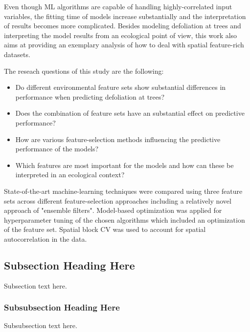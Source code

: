\documentclass[letterpaper, journal]{IEEEtran}
\begin{document}
Even though \ac{ML} algorithms are capable of handling highly-correlated input variables, the fitting time of models increase substantially and the interpretation of results becomes more complicated.
Besides modeling defoliation at trees and interpreting the model results from an ecological point of view, this work also aims at providing an exemplary analysis of how to deal with spatial feature-rich datasets.

The reseach questions of this study are the following:

\begin{itemize}

	\item Do different environmental feature sets show substantial differences in performance when predicting defoliation at trees?

    \item Does the combination of feature sets have an substantial effect on predictive performance?

    \item How are various feature-selection methods influencing the predictive performance of the models?

	\item Which features are most important for the models and how can these be interpreted in an ecological context?

\end{itemize}


\noindent State-of-the-art machine-learning techniques were compared using three feature sets across different feature-selection approaches including a relatively novel approach of "ensemble filters".
Model-based optimization was applied for hyperparameter tuning of the chosen algorithms which included an optimization of the feature set.
Spatial block \ac{CV} was used to account for spatial autocorrelation in the data.

\subsection{Subsection Heading Here}
Subsection text here.


\subsubsection{Subsubsection Heading Here}
Subsubsection text here.
\end{document}

